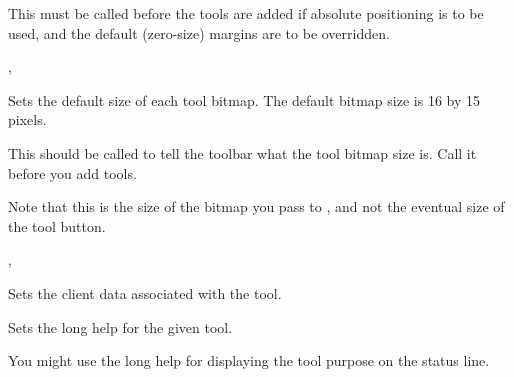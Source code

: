 
This must be called before the tools are added if absolute positioning is to be used, and the
default (zero-size) margins are to be overridden.


, 

\label{wxtoolbarsettoolbitmapsize}


Sets the default size of each tool bitmap. The default bitmap size is 16 by 15 pixels.




This should be called to tell the toolbar what the tool bitmap size is. Call
it before you add tools.

Note that this is the size of the bitmap you pass to ,
and not the eventual size of the tool button.


,\rtfsp
{}

\label{wxtoolbarsettoolclientdata}


Sets the client data associated with the tool.

\label{wxtoolbarsettoollonghelp}


Sets the long help for the given tool.





You might use the long help for displaying the tool purpose on the status line.

